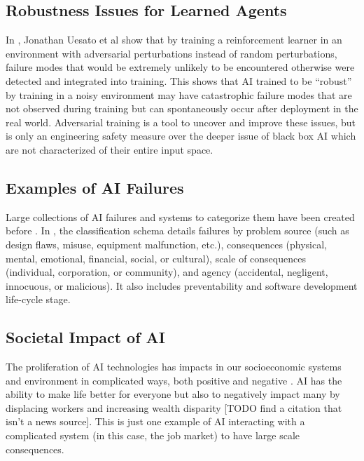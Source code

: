 \documentclass[11pt]{article}
\begin{document}
\subsection{Robustness Issues for Learned Agents}

In \cite{uesato2018adversarial}, Jonathan Uesato et al show that by training a reinforcement learner
in an environment with adversarial perturbations instead of random perturbations, failure modes that
would be extremely unlikely to be encountered otherwise were detected and integrated into training.
This shows that AI trained to be ``robust'' by training in a noisy environment may have catastrophic
failure modes that are not observed during training but can spontaneously occur after deployment in
the real world. Adversarial training is a tool to uncover and improve these issues, but is only an
engineering safety measure over the deeper issue of black box AI which are not characterized of
their entire input space.

\subsection{Examples of AI Failures}

Large collections of AI failures and systems to categorize them have been created before
\cite{yam2018historic} \cite{scott2020classification}. In \cite{scott2020classification}, the
classification schema details failures by problem source (such as design flaws, misuse, equipment
malfunction, etc.), consequences (physical, mental, emotional, financial, social, or
cultural), scale of consequences (individual, corporation, or community), and agency (accidental,
negligent, innocuous, or malicious). It also includes preventability and software development
life-cycle stage.

\subsection{Societal Impact of AI}

The proliferation of AI technologies has impacts in our socioeconomic systems and environment in
complicated ways, both positive and negative \cite{jayden2018sustainability}. AI has the ability to
make life better for everyone but also to negatively impact many by displacing workers and
increasing wealth disparity [TODO find a citation that isn't a news source]. This is just one
example of AI interacting with a complicated system (in this case, the job market) to have large
scale consequences. 
\end{document}
